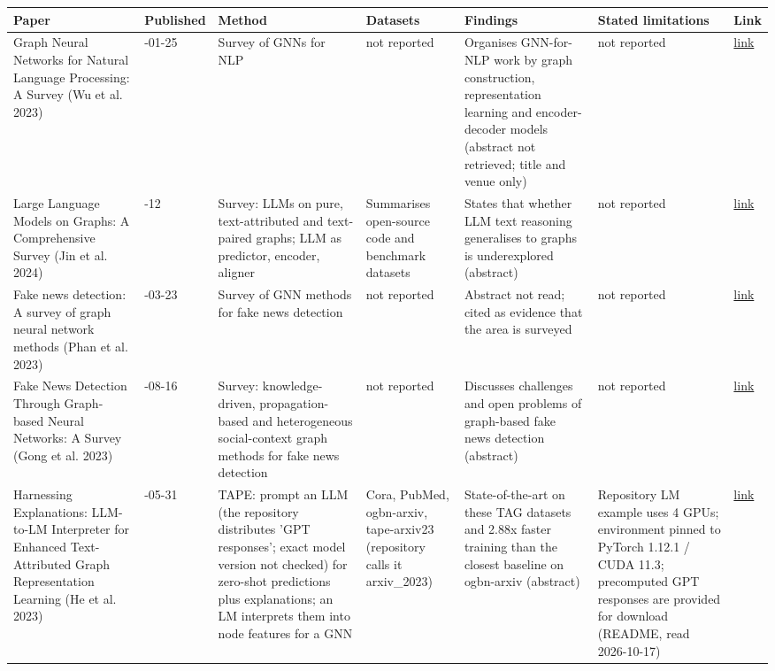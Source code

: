 \documentclass[11pt,a4paper]{article}
\begin{document}
{\small
\begin{longtable}{>{\raggedright\arraybackslash}p{}>{\raggedright\arraybackslash}p{}>{\raggedright\arraybackslash}p{}>{\raggedright\arraybackslash}p{}>{\raggedright\arraybackslash}p{}>{\raggedright\arraybackslash}p{}>{\raggedright\arraybackslash}p{}}
\toprule
\textbf{Paper} & \textbf{Published} & \textbf{Method} & \textbf{Datasets} & \textbf{Findings} & \textbf{Stated limitations} & \textbf{Link} \\
\midrule
\endhead
Graph Neural Networks for Natural Language Processing: A Survey (Wu et al. 2023) & 2023-01-25 & Survey of GNNs for NLP & not reported & Organises GNN-for-NLP work by graph construction, representation learning and encoder-decoder models (abstract not retrieved; title and venue only) & not reported & \href{https://doi.org/10.1561/2200000096}{link} \\
Large Language Models on Graphs: A Comprehensive Survey (Jin et al. 2024) & 2024-12 & Survey: LLMs on pure, text-attributed and text-paired graphs; LLM as predictor, encoder, aligner & Summarises open-source code and benchmark datasets & States that whether LLM text reasoning generalises to graphs is underexplored (abstract) & not reported & \href{https://doi.org/10.1109/tkde.2024.3469578}{link} \\
Fake news detection: A survey of graph neural network methods (Phan et al. 2023) & 2023-03-23 & Survey of GNN methods for fake news detection & not reported & Abstract not read; cited as evidence that the area is surveyed & not reported & \href{https://doi.org/10.1016/j.asoc.2023.110235}{link} \\
Fake News Detection Through Graph-based Neural Networks: A Survey (Gong et al. 2023) & 2023-08-16 & Survey: knowledge-driven, propagation-based and heterogeneous social-context graph methods for fake news detection & not reported & Discusses challenges and open problems of graph-based fake news detection (abstract) & not reported & \href{https://doi.org/10.21203/rs.3.rs-3252100/v1}{link} \\
Harnessing Explanations: LLM-to-LM Interpreter for Enhanced Text-Attributed Graph Representation Learning (He et al. 2023) & 2023-05-31 & TAPE: prompt an LLM (the repository distributes 'GPT responses'; exact model version not checked) for zero-shot predictions plus explanations; an LM interprets them into node features for a GNN & Cora, PubMed, ogbn-arxiv, tape-arxiv23 (repository calls it arxiv\_2023) & State-of-the-art on these TAG datasets and 2.88x faster training than the closest baseline on ogbn-arxiv (abstract) & Repository LM example uses 4 GPUs; environment pinned to PyTorch 1.12.1 / CUDA 11.3; precomputed GPT responses are provided for download (README, read 2026-10-17) & \href{https://arxiv.org/abs/2305.19523}{link} \\

\end{longtable}}
\end{document}
